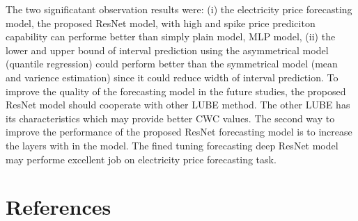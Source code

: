 \documentclass[review]{elsarticle}
\begin{document}
    The two significatant observation results were:
    (i) the electricity price forecasting model, the proposed ResNet model, with high and spike price prediciton capability can performe better than simply plain model, MLP model,
    (ii) the lower and upper bound of interval prediction using the asymmetrical model (quantile regression) could perform better than the symmetrical model (mean and varience estimation) since it could reduce width of interval prediction.
    To improve the quality of the forecasting model in the future studies, the proposed ResNet model should cooperate with other LUBE method.
    The other LUBE has its characteristics which may provide better CWC values.
    The second way to improve the performance of the proposed ResNet forecasting model is to increase the layers with in the model.
    The fined tuning forecasting deep ResNet model may performe excellent job on electricity price forecasting task.

  \section*{References}
  
\end{document}
